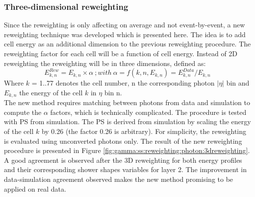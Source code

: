 \label{tab:avg}


\subsubsection{Three-dimensional reweighting}
Since the reweighting is only affecting on average and not event-by-event, a new reweighting technique was developed which is presented here. The idea is to add cell energy as an additional dimension to the previous reweighting procedure. The reweighting factor for each cell will be a function of cell energy. Instead of 2D reweighting the reweighting will be in three dimensions, defined as:
\begin{equation}
    E_{k,n}^{Rew} = E_{k,n} \times \alpha \ ; with \ \alpha = f(k,n,E_{k,n}) = E_{k,n}^{Data}/E_{k,n}
\end{equation}
Where $k$ = 1..77 denotes the cell number, n the corresponding photon $|\eta|$ bin and $E_{k,n}$  the energy of the cell $k$ in $\eta$ bin n. \\
The new method requires matching between photons from data and simulation to compute the $\alpha$ factors, which is technically complicated. The procedure is tested with PS from simulation. The PS is derived from simulation by scaling the energy of the cell $k$ by 0.26 (the factor 0.26 is arbitrary). For simplicity, the reweighting is evaluated using unconverted photons only.
The result of the new reweighting procedure is presented in Figure \ref{fig:gamma:ss:reweighting:photon:3dreweighting}. A good agreement is observed after the 3D reweighting for both energy profiles and their corresponding shower shapes variables for layer 2. The improvement in data-simulation agreement observed makes the new method promising to be applied on real data.
